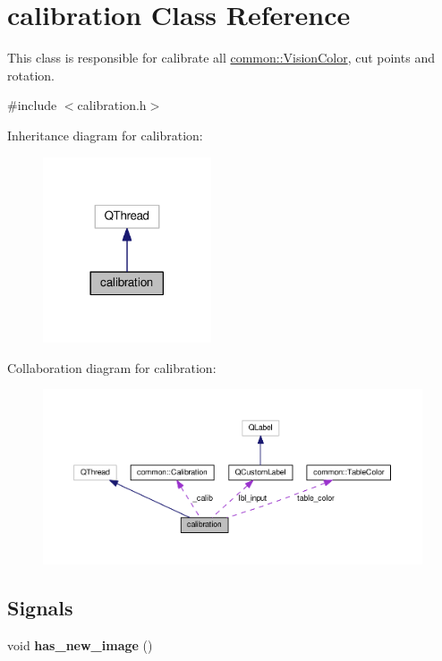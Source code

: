 \hypertarget{classcalibration}{}\section{calibration Class Reference}
\label{classcalibration}


This class is responsible for calibrate all \hyperlink{structcommon_1_1VisionColor}{common\+::\+Vision\+Color}, cut points and rotation.  




{\ttfamily \#include $<$calibration.\+h$>$}



Inheritance diagram for calibration\+:
\nopagebreak
\begin{figure}[H]
\begin{center}
\leavevmode
\includegraphics[width=141pt]{classcalibration__inherit__graph}
\end{center}
\end{figure}


Collaboration diagram for calibration\+:
\nopagebreak
\begin{figure}[H]
\begin{center}
\leavevmode
\includegraphics[width=350pt]{classcalibration__coll__graph}
\end{center}
\end{figure}
\subsection*{Signals}
\begin{DoxyCompactItemize}
\item 
void {\bfseries has\+\_\+new\+\_\+image} ()\hypertarget{classcalibration_a7e9eab43274288524d9d3c1a9d0f3b87}{}\label{classcalibration_a7e9eab43274288524d9d3c1a9d0f3b87}

\end{DoxyCompactItemize}
